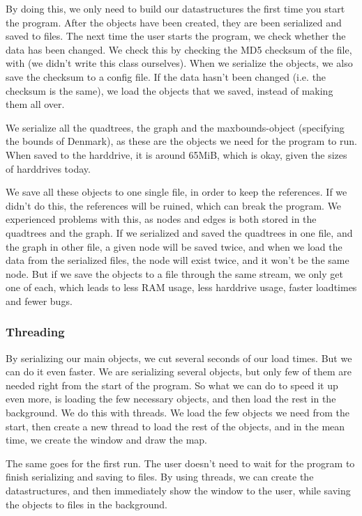 By doing this, we only need to build our datastructures the first time you start the program. 
After the objects have been created, they are been serialized and saved to files. The next 
time the user starts the program, we check whether the data has been changed. We check 
this by checking the MD5 checksum of the file, with  (we didn't write 
this class ourselves). When we serialize the objects, we also save the checksum to a config 
file. If the data hasn't been changed (i.e. the checksum is the same), we load the objects that 
we saved, instead of making them all over.

We serialize all the quadtrees, the graph and the maxbounds-object (specifying the bounds 
of Denmark), as these are the objects we need for the program to run. When saved to the 
harddrive, it is around 65MiB, which is okay, given the sizes of harddrives today.

We save all these objects to one single file, in order to keep the references. If we didn't do 
this, the references will be ruined, which can break the program. We experienced problems 
with this, as nodes and edges is both stored in the quadtrees and the graph. If we serialized 
and saved the quadtrees in one file, and the graph in other file, a given node will be saved 
twice, and when we load the data from the serialized files, the node will exist twice, and it 
won't be the same node. But if we save the objects to a file through the same stream, we only 
get one of each, which leads to less RAM usage, less harddrive usage, faster loadtimes and 
fewer bugs.

\subsubsection{Threading}
By serializing our main objects, we cut several seconds of our load times. But we can do it 
even faster. We are serializing several objects, but only few of them are needed right from 
the start of the program. So what we can do to speed it up even more, is loading the few 
necessary objects, and then load the rest in the background. We do this with threads. 
We load the few objects we need from the start, then create a new thread to load the rest 
of the objects, and in the mean time, we create the window and draw the map.

The same goes for the first run. The user doesn't need to wait for the program to finish 
serializing and saving to files. By using threads, we can create the datastructures, and 
then immediately show the window to the user, while saving the objects to files in the 
background.

